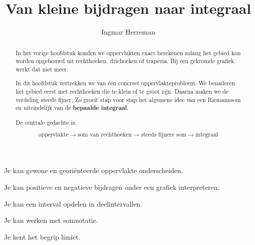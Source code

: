 \documentclass{ximera}
\title{Van kleine bijdragen naar integraal}
\author{Ingmar Herreman}
\begin{document}












\begin{abstract}
In het vorige hoofdstuk konden we oppervlakten exact berekenen zolang
het gebied kon worden opgebouwd uit rechthoeken, driehoeken of
trapezia. Bij een gekromde grafiek werkt dat niet meer.

In dit hoofdstuk vertrekken we van één concreet oppervlakteprobleem.
We benaderen het gebied eerst met rechthoeken die te klein of te groot
zijn. Daarna maken we de verdeling steeds fijner. Zo groeit stap voor
stap het algemene idee van een Riemannsom en uiteindelijk van de
\textbf{bepaalde integraal}.

De centrale gedachte is:

\[
\boxed{
\text{oppervlakte}
\longrightarrow
\text{som van rechthoeken}
\longrightarrow
\text{steeds fijnere som}
\longrightarrow
\text{integraal}
}
\]
\end{abstract}

\maketitle


\begin{voorkennis}
    \item Je kan gewone en georiënteerde oppervlakte onderscheiden.
    \item Je kan positieve en negatieve bijdragen onder een grafiek interpreteren.
    \item Je kan een interval opdelen in deelintervallen.
    \item Je kan werken met somnotatie.
    \item Je kent het begrip limiet.
\end{voorkennis}
\end{document}
